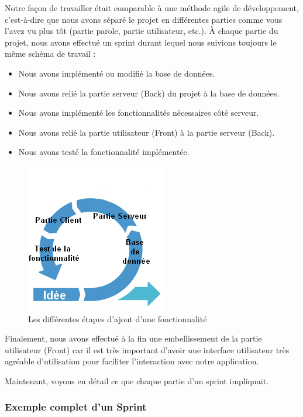 \documentclass[12pt,french]{article}
\begin{document}
Notre façon de travailler était comparable à une méthode agile de développement, c'est-à-dire que nous avons séparé le projet en différentes parties comme vous l'avez vu plus tôt (partie parole, partie utilisateur, etc.). À chaque partie du projet, nous avons effectué un \gls{sprint} durant lequel nous suivions toujours le même schéma de travail :

\begin{itemize}
	\item Nous avons implémenté ou modifié la base de données.
	\item Nous avons relié la partie serveur (\gls{Back}) du projet à la base de données.
	\item Nous avons implémenté les fonctionnalités nécessaires côté serveur.
	\item Nous avons relié la partie utilisateur (\gls{Front}) à la partie serveur (\gls{Back}).
	\item Nous avons testé la fonctionnalité implémentée.
\end{itemize}

\begin{figure}[H]
	\centering
	\includegraphics[scale=1]{agile.png}
	\caption{Les différentes étapes d'ajout d'une fonctionnalité}
\end{figure}

Finalement, nous avons effectué à la fin une embellissement de la partie utilisateur (\gls{Front}) car il est très important d'avoir une interface utilisateur très agréable d'utilisation pour faciliter l'interaction avec notre application.

Maintenant, voyons en détail ce que chaque partie d'un \gls{sprint} impliquait.

\subsubsection{Exemple complet d'un Sprint}
\end{document}
